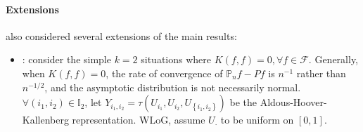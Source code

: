 \documentclass[twoside]{article}
\begin{document}
\paragraph*{Extensions}
\citet{davezies2021empirical} also considered several extensions of the main results:
\begin{itemize}
    \item {}: consider the simple $k=2$ situations where $K(f,f)=0, \forall f\in\mathcal{F}$. 
    Generally, when $K(f,f)=0$, the rate of convergence of $\mathbb{P}_nf -Pf$ is $n^{-1}$ rather than $n^{-1/2}$, and the asymptotic distribution is not necessarily normal. $\forall (i_1,i_2)\in\mathbb{I}_2$, let $Y_{i_1,i_2}=\tau\left( U_{i_1},U_{i_2},U_{\left\{i_1,i_2\right\}} \right)$ be the Aldous-Hoover-Kallenberg representation. WLoG, assume $U_{\cdot}$ to be uniform on $[0,1]$.
    

\end{itemize}
\end{document}

